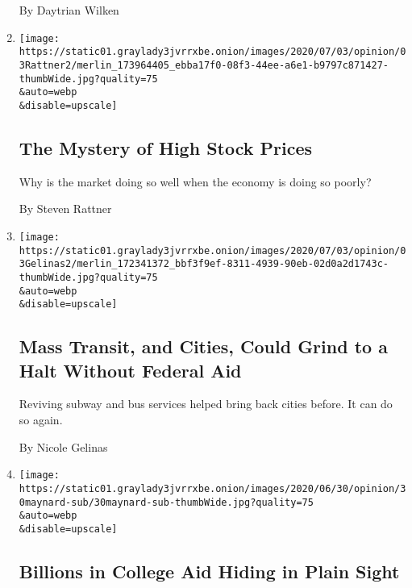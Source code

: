 \begin{enumerate}
  By Daytrian Wilken
\item
  \href{/2020/07/03/opinion/stock-market.html}{}

  \texttt{[image: https://static01.graylady3jvrrxbe.onion/images/2020/07/03/opinion/03Rattner2/merlin\_173964405\_ebba17f0-08f3-44ee-a6e1-b9797c871427-thumbWide.jpg?quality=75\\\&auto=webp\\\&disable=upscale]}

  \hypertarget{the-mystery-of-high-stock-prices}{%
  \subsection{The Mystery of High Stock
  Prices}\label{the-mystery-of-high-stock-prices}}

  Why is the market doing so well when the economy is doing so poorly?

  By Steven Rattner
\item
  \href{/2020/07/03/opinion/coronavirus-mass-transit.html}{}

  \texttt{[image: https://static01.graylady3jvrrxbe.onion/images/2020/07/03/opinion/03Gelinas2/merlin\_172341372\_bbf3f9ef-8311-4939-90eb-02d0a2d1743c-thumbWide.jpg?quality=75\\\&auto=webp\\\&disable=upscale]}

  \hypertarget{mass-transit-and-cities-could-grind-to-a-halt-without-federal-aid}{%
  \subsection{Mass Transit, and Cities, Could Grind to a Halt Without
  Federal
  Aid}\label{mass-transit-and-cities-could-grind-to-a-halt-without-federal-aid}}

  Reviving subway and bus services helped bring back cities before. It
  can do so again.

  By Nicole Gelinas
\item
  \href{/2020/06/30/opinion/college-financial-aid.html}{}

  \texttt{[image: https://static01.graylady3jvrrxbe.onion/images/2020/06/30/opinion/30maynard-sub/30maynard-sub-thumbWide.jpg?quality=75\\\&auto=webp\\\&disable=upscale]}

  \hypertarget{billions-in-college-aid-hiding-in-plain-sight}{%
  \subsection{Billions in College Aid Hiding in Plain
  Sight}\label{billions-in-college-aid-hiding-in-plain-sight}}


\end{enumerate}
